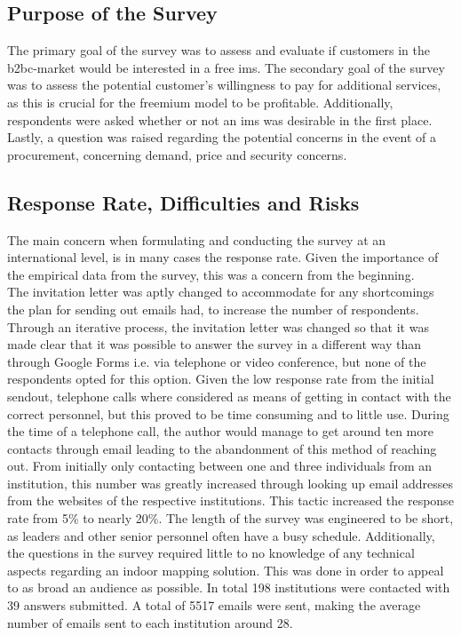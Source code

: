 \subsection{Purpose of the Survey}
The primary goal of the survey was to assess and evaluate if customers in the \gls{b2bc}-market would be interested in a free \gls{ims}. The secondary goal of the survey was to assess the potential customer's willingness to pay for additional services, as this is crucial for the freemium model to be profitable. Additionally, respondents were asked whether or not an \gls{ims} was desirable in the first place. Lastly, a question was raised regarding the potential concerns in the event of a procurement, concerning demand, price and security concerns.

\subsection{Response Rate, Difficulties and Risks}
The main concern when formulating and conducting the survey at an international level, is in many cases the response rate. Given the importance of the empirical data from the survey, this was a concern from the beginning. 
\newline
\\
The invitation letter was aptly changed to accommodate for any shortcomings the plan for sending out emails had, to increase the number of respondents. Through an iterative process, the invitation letter was changed so that it was made clear that it was possible to answer the survey in a different way than through Google Forms i.e. via telephone or video conference, but none of the respondents opted for this option. Given the low response rate from the initial sendout, telephone calls where considered as means of getting in contact with the correct personnel, but this proved to be time consuming and to little use. During the time of a telephone call, the author would manage to get around ten more contacts through email leading to the abandonment of this method of reaching out. From initially only contacting between one and three individuals from an institution, this number was greatly increased through looking up email addresses from the websites of the respective institutions. This tactic increased the response rate from 5\% to nearly 20\%.  The length of the survey was engineered to be short, as leaders and other senior personnel often have a busy schedule. Additionally, the questions in the survey required little to no knowledge of any technical aspects regarding an indoor mapping solution. This was done in order to appeal to as broad an audience as possible. In total 198 institutions were contacted with 39 answers submitted. A total of 5517 emails were sent, making the average number of emails sent to each institution around 28. 
